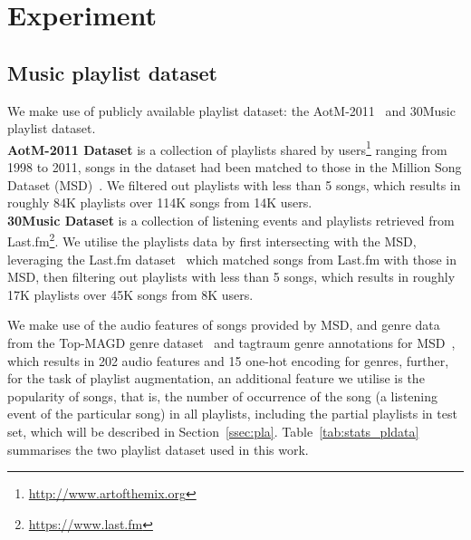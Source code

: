 \section{Experiment}
\label{sec:experiment}

\subsection{Music playlist dataset}
We make use of publicly available playlist dataset: the AotM-2011~\cite{mcfee2012hypergraph} and 30Music~\cite{30music2015} playlist dataset. \\
%
{\bf AotM-2011 Dataset} is a collection of playlists shared by users\footnote{\url{http://www.artofthemix.org}} ranging from 1998 to 2011, 
songs in the dataset had been matched to those in the Million Song Dataset (MSD)~\cite{msd2011}.
We filtered out playlists with less than 5 songs, which results in roughly 84K playlists over 114K songs from 14K users. \\
%
{\bf 30Music Dataset} is a collection of listening events and playlists retrieved from Last.fm\footnote{\url{https://www.last.fm}}.
We utilise the playlists data by first intersecting with the MSD, leveraging the Last.fm dataset~\cite{lastfmdataset} 
which matched songs from Last.fm with those in MSD, then filtering out playlists with less than 5 songs, 
which results in roughly 17K playlists over 45K songs from 8K users.

We make use of the audio features of songs provided by MSD, 
and genre data from the Top-MAGD genre dataset~\cite{schindler2012facilitating} and tagtraum genre annotations for MSD~\cite{schreiber2015improving},
which results in 202 audio features and 15 one-hot encoding for genres,
further, for the task of playlist augmentation, an additional feature we utilise is the popularity of songs,
that is, the number of occurrence of the song (\ie a listening event of the particular song) in all playlists,
including the partial playlists in test set, which will be described in Section~\ref{ssec:pla}.
%
%
Table~\ref{tab:stats_pldata} summarises the two playlist dataset used in this work.
%
\begin{table}[!h]
\centering
\caption{Statistics of music playlist dataset}
\label{tab:stats_pldata}
\end{table}


